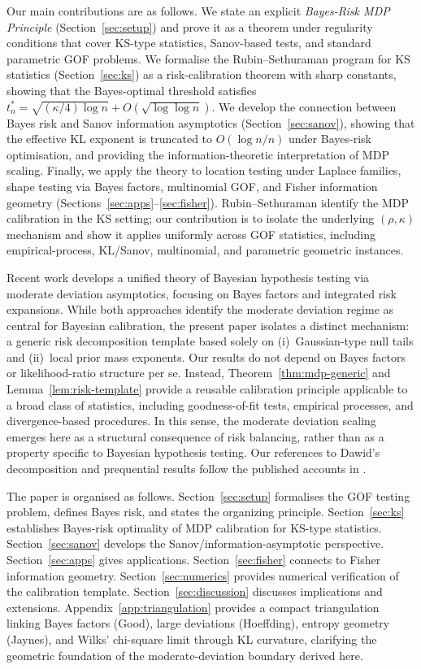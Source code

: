 \documentclass[11pt]{article}
\newcommand{\rhotail}{\rho}  %
\newcommand{\1}{\mathbf{1}}
\theoremstyle{plain}
\theoremstyle{definition}
\theoremstyle{remark}
\begin{document}
Our main contributions are as follows.
We state an explicit \emph{Bayes-Risk MDP Principle} (Section~\ref{sec:setup}) and prove it as a theorem under regularity conditions that cover KS-type statistics, Sanov-based tests, and standard parametric GOF problems.
We formalise the Rubin--Sethuraman program for KS statistics (Section~\ref{sec:ks}) as a risk-calibration theorem with sharp constants, showing that the Bayes-optimal threshold satisfies $t_n^* = \sqrt{(\kappa/4)\log n} + O(\sqrt{\log\log n})$.
We develop the connection between Bayes risk and Sanov information asymptotics (Section~\ref{sec:sanov}), showing that the effective KL exponent is truncated to $O(\log n / n)$ under Bayes-risk optimisation, and providing the information-theoretic interpretation of MDP scaling.
Finally, we apply the theory to location testing under Laplace families, shape testing via Bayes factors, multinomial GOF, and Fisher information geometry (Sections~\ref{sec:apps}--\ref{sec:fisher}).
Rubin--Sethuraman identify the MDP calibration in the KS setting; our contribution is to isolate the underlying $(\rhotail,\kappa)$ mechanism and show it applies uniformly across GOF statistics, including empirical-process, KL/Sanov, multinomial, and parametric geometric instances.

Recent work \citep{DPSZ2026} develops a unified theory of Bayesian hypothesis testing via moderate deviation asymptotics, focusing on Bayes factors and integrated risk expansions.
While both approaches identify the moderate deviation regime as central for Bayesian calibration, the present paper isolates a distinct mechanism: a generic risk decomposition template based solely on (i)~Gaussian-type null tails and (ii)~local prior mass exponents.
Our results do not depend on Bayes factors or likelihood-ratio structure per se.
Instead, Theorem~\ref{thm:mdp-generic} and Lemma~\ref{lem:risk-template} provide a reusable calibration principle applicable to a broad class of statistics, including goodness-of-fit tests, empirical processes, and divergence-based procedures.
In this sense, the moderate deviation scaling emerges here as a structural consequence of risk balancing, rather than as a property specific to Bayesian hypothesis testing.
Our references to Dawid's decomposition and prequential results follow the published accounts in \citet{Dawid2011PosteriorModelProbabilities,Dawid1992Prequential}.

The paper is organised as follows.
Section~\ref{sec:setup} formalises the GOF testing problem, defines Bayes risk, and states the organizing principle.
Section~\ref{sec:ks} establishes Bayes-risk optimality of MDP calibration for KS-type statistics.
Section~\ref{sec:sanov} develops the Sanov/information-asymptotic perspective.
Section~\ref{sec:apps} gives applications.
Section~\ref{sec:fisher} connects to Fisher information geometry.
Section~\ref{sec:numerics} provides numerical verification of the calibration template.
Section~\ref{sec:discussion} discusses implications and extensions.
Appendix~\ref{app:triangulation} provides a compact triangulation linking Bayes factors (Good), large deviations (Hoeffding), entropy geometry (Jaynes), and Wilks' chi-square limit through KL curvature, clarifying the geometric foundation of the moderate-deviation boundary derived here.
\end{document}
